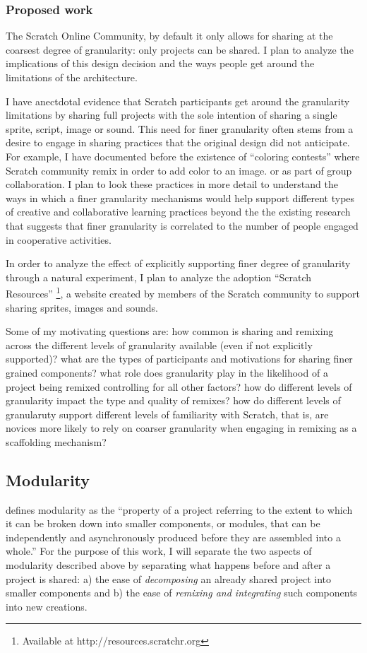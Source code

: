 \subsubsection{Proposed work}
The Scratch Online Community, by default it only allows for sharing at the coarsest degree of granularity: only projects can be shared. 
I plan to analyze the implications of this design decision and the ways  people get around the limitations of the architecture.

I have anectdotal evidence that Scratch participants get around the granularity limitations by sharing full projects with the sole intention of sharing a single sprite, script, image or sound.
This need for finer granularity often stems from a desire to engage in sharing practices that the original design did not anticipate. For example, I have documented before the existence of ``coloring contests'' \citep{nickerson_appropriation_2011} where Scratch community remix in order to add color to an image. or as part of group collaboration.
I plan to look these practices in more detail to understand the ways in which a finer granularity mechanisms would help support different types of creative and collaborative learning practices beyond the the existing research that suggests that finer granularity is correlated to the number of people engaged in cooperative activities.

In order to analyze the effect of explicitly supporting finer degree of granularity through a natural experiment, I plan to analyze the adoption ``Scratch Resources'' \footnote{Available at http://resources.scratchr.org}, a website created by members of the Scratch community to support sharing sprites, images and sounds. 

Some of my motivating questions are: 
how common is sharing and remixing across the different levels of granularity available (even if not explicitly supported)?
what are the types of participants and motivations for sharing finer grained components?
what role does granularity play in the likelihood of a project being remixed controlling for all other factors?
how do different levels of granularity impact the type and quality of remixes?
how do different levels of granularuty support different levels of familiarity with Scratch, that is, are novices more likely to rely on coarser granularity when engaging in remixing as a scaffolding mechanism?

\subsection{Modularity}
\citet{benkler_coases_2002} defines modularity as the ``property of a project referring to the extent to which it can be broken down into smaller components, or modules, that can be independently and asynchronously produced before they are assembled into a whole.''
For the purpose of this work, I will separate the two aspects of modularity described above by separating what happens before and after a project is shared:
a) the ease of \emph{decomposing} an already shared project into smaller components and 
b) the ease of \emph{remixing and integrating} such components into new creations.

